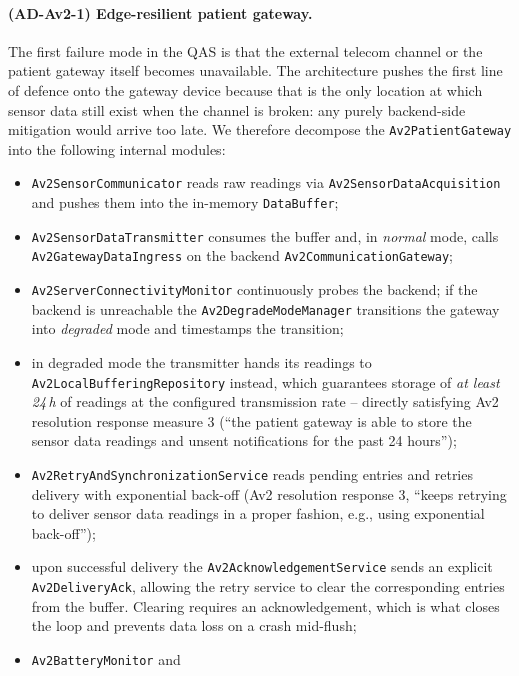 \paragraph{(AD-Av2-1) Edge-resilient patient gateway.}
The first failure mode in the QAS is that the external telecom channel or
the patient gateway itself becomes unavailable. The architecture pushes the
first line of defence onto the gateway device because that is the only
location at which sensor data still exist when the channel is broken: any
purely backend-side mitigation would arrive too late. We therefore
decompose the \texttt{Av2PatientGateway} into the following internal
modules:
\begin{itemize}
  \item \texttt{Av2SensorCommunicator} reads raw readings via
        \texttt{Av2SensorDataAcquisition} and pushes them into the
        in-memory \texttt{DataBuffer};
  \item \texttt{Av2SensorDataTransmitter} consumes the buffer and, in
        \emph{normal} mode, calls \texttt{Av2GatewayDataIngress} on the
        backend \texttt{Av2CommunicationGateway};
  \item \texttt{Av2ServerConnectivityMonitor} continuously probes the
        backend; if the backend is unreachable the
        \texttt{Av2DegradeModeManager} transitions the gateway into
        \emph{degraded} mode and timestamps the transition;
  \item in degraded mode the transmitter hands its readings to
        \texttt{Av2LocalBufferingRepository} instead, which guarantees
        storage of \emph{at least 24\,h} of readings at the configured
        transmission rate -- directly satisfying Av2 resolution response
        measure 3 (``the patient gateway is able to store the sensor data
        readings and unsent notifications for the past 24 hours'');
  \item \texttt{Av2RetryAndSynchronizationService} reads pending entries
        and retries delivery with exponential back-off (Av2 resolution
        response 3, ``keeps retrying to deliver sensor data readings in a
        proper fashion, e.g., using exponential back-off'');
  \item upon successful delivery the \texttt{Av2AcknowledgementService}
        sends an explicit \texttt{Av2DeliveryAck}, allowing the retry
        service to clear the corresponding entries from the buffer.
        Clearing requires an acknowledgement, which is what closes the
        loop and prevents data loss on a crash mid-flush;
  \item \texttt{Av2BatteryMonitor} and

\end{itemize}
